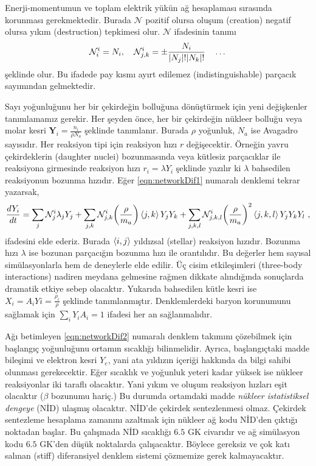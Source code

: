 Enerji-momentumun ve toplam elektrik yükün ağ hesaplaması sırasında korunması gerekmektedir. Burada  $ \mathcal{N} $ pozitif olursa oluşum (creation) negatif olursa yıkım (destruction) tepkimesi olur. $ \mathcal{N} $ ifadesinin tanımı 
\begin{equation}
    \mathcal{N}^{i}_{i}=N_{i},\quad \mathcal{N}^{i}_{j,k}=\pm \frac{N_{i}}{\abs{N_{j} }!\abs{N_{k} }!}\quad \dots
\end{equation}
şeklinde olur. Bu ifadede pay kısmı ayırt edilemez (indistinguishable) parçacık sayımından gelmektedir.

Sayı yoğunluğunu her bir çekirdeğin bolluğuna dönüştürmek için yeni değişkenler tanımlamamız gerekir. Her şeyden önce, her bir çekirdeğin nükleer bolluğu veya molar kesri $ \mathbf{Y}_{i}=\frac{n_{i}}{\rho N_{a}} $ şeklinde tanımlanır. Burada $ \rho $ yoğunluk, $ N_{a} $ ise Avagadro sayısıdır. Her reaksiyon tipi için reaksiyon hızı $ r $ değişecektir. Örneğin yavru çekirdeklerin (daughter nuclei) bozunmasında veya kütlesiz parçacıklar ile reaksiyona girmesinde reaksiyon hızı $ r_{i}=\lambda Y_{i} $ şeklinde yazılır ki $ \lambda $ bahsedilen reaksiyonun bozunma hızıdır. Eğer \eqref{eqn:networkDif1} numaralı denklemi tekrar yazarsak,
\begin{equation}\label{eqn:networkDif2}
    \frac{d Y_{i}}{dt}=\sum_{j}  \mathcal{N}^{i}_{j} \lambda_{j}Y_{j}+ \sum_{j,k} \mathcal{N}^{i}_{j,k} \qty(\frac{\rho}{m_{a}}) \expval{j,k}Y_{j}Y_{k}+ \sum_{j,k,l} \mathcal{N}^{i}_{j,k,l}\qty(\frac{\rho}{m_{a}})^{2} \expval{j,k,l}Y_{j}Y_{k}Y_{l} \text{ ,} 
\end{equation}
ifadesini elde ederiz. Burada $ \expval{i,j} $ yıldızsal (stellar) reaksiyon hızıdır. Bozunma hızı $ \lambda $ ise bozunan parçacığın bozunma hızı ile orantılıdır. Bu değerler hem sayısal simülasyonlarla hem de deneylerle elde edilir. Üç cisim etkileşimleri (three-body interactions) nadiren meydana gelmesine rağmen dikkate alındığında sonuçlarda dramatik etkiye sebep olacaktır. Yukarıda bahsedilen kütle kesri ise $ X_{i}=A_{i}Yi=\frac{\rho_{i}}{\rho} $ şeklinde tanımlanmıştır. Denklemlerdeki baryon korunumunu sağlamak için $ \sum_{i}Y_{i}A_{i}=1 $ ifadesi her an sağlanmalıdır.

Ağı betimleyen \eqref{eqn:networkDif2} numaralı denklem takımını çözebilmek için başlangıç yoğunluğunu ortamın sıcaklığı bilinmelidir. Ayrıca, başlangıçtaki madde bileşimi ve elektron kesri $ Y_{e} $, yani ata yıldızın içeriği hakkında da bilgi sahibi olunması gerekecektir. Eğer sıcaklık ve yoğunluk yeteri kadar yüksek ise nükleer reaksiyonlar iki taraflı olacaktır. Yani yıkım ve oluşum reaksiyon hızları eşit olacaktır ($ \beta $ bozunumu hariç.) Bu durumda ortamdaki madde \emph{nükleer istatistiksel dengeye} (NİD) ulaşmış olacaktır. NİD'de çekirdek sentezlenmesi olmaz. Çekirdek sentezleme hesaplama zamanını azaltmak için nükleer ağ kodu NİD'den çıktığı noktadan başlar. Bu çalışmada NİD sıcaklığı $ 6.5 $ GK civarıdır ve ağ simülasyon kodu $ 6.5 $ GK'den düşük noktalarda çalışacaktır. Böylece gereksiz ve çok katı salınan (stiff) diferansiyel denklem sistemi çözmemize gerek kalmayacaktır.

